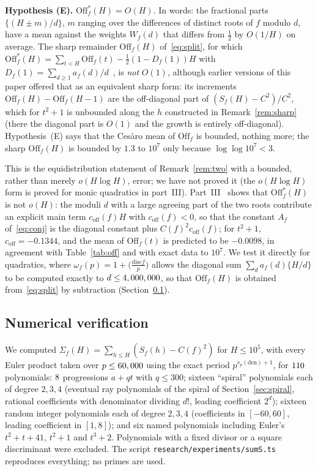 \documentclass[11pt,a4paper]{article}
\theoremstyle{remark}\newtheorem{remark}[theorem]{Remark}
\begin{document}
\medskip\noindent\textbf{Hypothesis (E).} $\mathrm{Off}^\ast_f(H)=O(H)$. In words: the fractional parts $\{(H\pm m)/d\}$, $m$ ranging
over the differences of distinct roots of $f$ modulo $d$, have a mean against the weights $W_f(d)$ that differs from
$\tfrac12$ by $O(1/H)$ on average. The sharp remainder $\mathrm{Off}_f(H)$ of~\eqref{eq:split}, for which
$\mathrm{Off}^\ast_f(H)=\sum_{t<H}\mathrm{Off}_f(t)-\tfrac12(1-D_f(1))H$ with $D_f(1)=\sum_{d\ge1}a_f(d)/d$~\cite{ReichardtIII},
is \emph{not} $O(1)$, although earlier versions of this paper offered that as an equivalent sharp form: its increments
$\mathrm{Off}_f(H)-\mathrm{Off}_f(H-1)$ are the off-diagonal part of $(S_f(H)-C^2)/C^2$, which for $t^2+1$ is unbounded
along the $h$ constructed in Remark~\ref{rem:sharp} (there the diagonal part is $O(1)$ and the growth is entirely
off-diagonal). Hypothesis~(E) says that the Ces\`aro mean of $\mathrm{Off}_f$ is bounded, nothing more; the sharp
$\mathrm{Off}_f(H)$ is bounded by $1.3$ to $10^7$ only because $\log\log10^7<3$.

\medskip\noindent
This is the equidistribution statement of Remark~\ref{rem:two} with a bounded, rather than merely
$o(H\log H)$, error; we have not proved it (the $o(H\log H)$ form is proved for monic quadratics in part~III). Part~III~\cite{ReichardtIII} shows that $\mathrm{Off}^\ast_f(H)$ is not $o(H)$: the moduli
$d$ with a large agreeing part of the two roots contribute an explicit main term $c_{\mathrm{off}}(f)H$ with
$c_{\mathrm{off}}(f)<0$, so that the constant $A_f$ of~\eqref{eq:conj} is the diagonal constant plus $C(f)^2c_{\mathrm{off}}(f)$;
for $t^2+1$, $c_{\mathrm{off}}=-0.1344$, and the mean of $\mathrm{Off}_f(t)$ is predicted to be $-0.0098$, in agreement with
Table~\ref{tab:off} and with exact data to $10^7$. We test it directly for quadratics, where $\omega_f(p)=1+\bigl(\frac{\mathrm{disc}f}{p}\bigr)$
allows the diagonal sum $\sum_d a_f(d)\{H/d\}$ to be computed exactly to $d\le4,000,000$, so that
$\mathrm{Off}_f(H)$ is obtained from~\eqref{eq:split} by subtraction (Section~\ref{sec:sumnum}).

\subsection{Numerical verification}\label{sec:sumnum}

We computed $\Sigma_f(H)=\sum_{h\le H}(S_f(h)-C(f)^2)$ for $H\le10^5$, with every Euler product taken
over $p\le60,000$ using the exact period $p^{v_p(\mathrm{den})+1}$, for $110$ polynomials: $8$
progressions $a+qt$ with $q\le300$; sixteen ``spiral'' polynomials each of degree $2,3,4$ (eventual
ray polynomials of the spiral of Section~\ref{sec:spiral}, rational coefficients with denominator
dividing $d!$, leading coefficient $2^d$); sixteen random integer polynomials each of degree $2,3,4$
(coefficients in $[-60,60]$, leading coefficient in $[1,8]$); and six named polynomials including
Euler's $t^2+t+41$, $t^2+1$ and $t^3+2$. Polynomials with a fixed divisor or a square discriminant were
excluded. The script \texttt{research/experiments/sumS.ts} reproduces everything; no primes are used.
\end{document}
